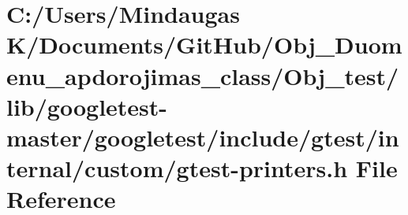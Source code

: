 \hypertarget{_obj__test_2lib_2googletest-master_2googletest_2include_2gtest_2internal_2custom_2gtest-printers_8h}{}\section{C\+:/\+Users/\+Mindaugas K/\+Documents/\+Git\+Hub/\+Obj\+\_\+\+Duomenu\+\_\+apdorojimas\+\_\+class/\+Obj\+\_\+test/lib/googletest-\/master/googletest/include/gtest/internal/custom/gtest-\/printers.h File Reference}
\label{_obj__test_2lib_2googletest-master_2googletest_2include_2gtest_2internal_2custom_2gtest-printers_8h}
